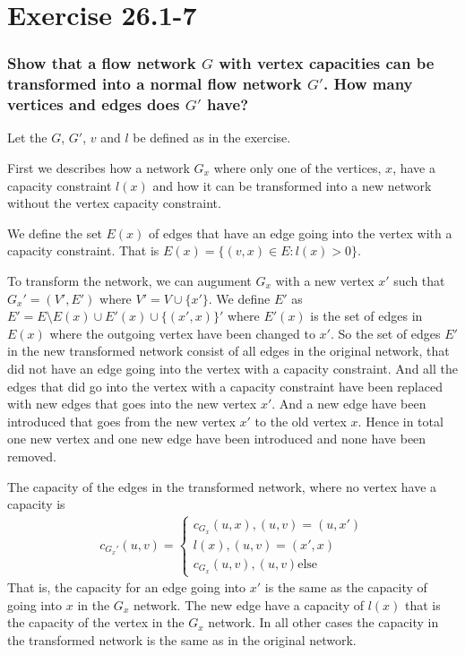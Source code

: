 \section*{Exercise 26.1-7}
\subsubsection*{Show that a flow network $G$ with vertex capacities can be transformed into a normal flow network $G'$. How many vertices and edges does $G'$ have?}
Let the $G$, $G'$, $v$ and $l$ be defined as in the exercise.

First we describes how a network $G_x$ where only one of the vertices, $x$, have a capacity constraint $l(x)$ and how it can be transformed into a new network without the vertex capacity constraint.

We define the set $E(x)$ of edges that have an edge going into the vertex with a capacity constraint. That is $E(x)  = \{(v,x) \in E: l(x)>0\}$.

To transform the network, we can augument $G_x$ with a new vertex $x'$ such that  $G_x' = (V',E')$ where $V' = V \cup \{x'\}$. We define $E'
$ as $E' = E\setminus E(x) \cup E'(x) \cup \{(x',x)\}'$ where $E'(x)$ is the set of edges in $E(x)$ where the outgoing vertex have been changed to $x'$. So the set of edges $E'$ in the new transformed network consist of all edges in the original network, that did not have an edge going into the vertex with a capacity constraint. And all the edges that did go into the vertex with a capacity constraint have been replaced with new edges that goes into the new vertex $x'$. And a new edge have been introduced that goes from the new vertex $x'$ to the old vertex $x$. Hence in total one new vertex and one new edge have been introduced and none have been removed.

The capacity of the edges in the transformed network, where no vertex have a capacity is
\begin{align*}
c_{G_x'}(u,v) = 
\begin{cases}
c_{G_x}(u,x), (u,v) = (u,x')\\
l(x), (u,v) = (x',x)\\
c_{G_x}(u,v), (u,v) \text{else}
\end{cases}
\end{align*}
That is, the capacity for an edge going into $x'$ is the same as the capacity of going into $x$ in the $G_x$ network. The new edge have a capacity of $l(x)$ that is the capacity of the vertex in the $G_x$ network. In all other cases the capacity in the transformed network is the same as in the original network.

